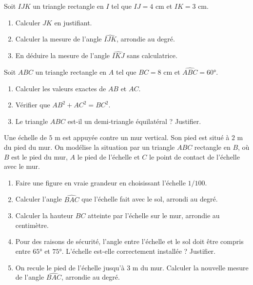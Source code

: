 \documentclass[11pt]{article}
\newcounter{popsec}
\newcounter{popsub}
\newcommand{\courssub}[1]{%
  \stepcounter{popsub}%
  \par\vspace{9pt}\noindent{\popxbold\fontsize{11.5}{13}\selectfont\color{popink}{\color{poporange}\thepopsec.\thepopsub}\hspace{6pt}#1}\par\nopagebreak\vspace{4pt}
}
\begin{document}
\begin{exercice}
Soit $IJK$ un triangle rectangle en $I$ tel que $IJ = 4$ cm et $IK = 3$ cm.
\begin{enumerate}
\item Calculer $JK$ en justifiant.
\item Calculer la mesure de l'angle $\widehat{IJK}$, arrondie au degré.
\item En déduire la mesure de l'angle $\widehat{IKJ}$ sans calculatrice.
\end{enumerate}
\end{exercice}

\begin{exercice}
Soit $ABC$ un triangle rectangle en $A$ tel que $BC = 8$ cm et $\widehat{ABC} = 60°$.
\begin{enumerate}
\item Calculer les valeurs exactes de $AB$ et $AC$.
\item Vérifier que $AB^2 + AC^2 = BC^2$.
\item Le triangle $ABC$ est-il un demi-triangle équilatéral ? Justifier.
\end{enumerate}
\end{exercice}

\courssub{Je me prépare au BEPC}

\begin{exercice}
Une échelle de $5$ m est appuyée contre un mur vertical. Son pied est situé à $2$ m du pied du mur. On modélise la situation par un triangle $ABC$ rectangle en $B$, où $B$ est le pied du mur, $A$ le pied de l'échelle et $C$ le point de contact de l'échelle avec le mur.
\begin{enumerate}
\item Faire une figure en vraie grandeur en choisissant l'échelle $1/100$.
\item Calculer l'angle $\widehat{BAC}$ que l'échelle fait avec le sol, arrondi au degré.
\item Calculer la hauteur $BC$ atteinte par l'échelle sur le mur, arrondie au centimètre.
\item Pour des raisons de sécurité, l'angle entre l'échelle et le sol doit être compris entre $65°$ et $75°$. L'échelle est-elle correctement installée ? Justifier.
\item On recule le pied de l'échelle jusqu'à $3$ m du mur. Calculer la nouvelle mesure de l'angle $\widehat{BAC}$, arrondie au degré.
\end{enumerate}
\end{exercice}
\end{document}
